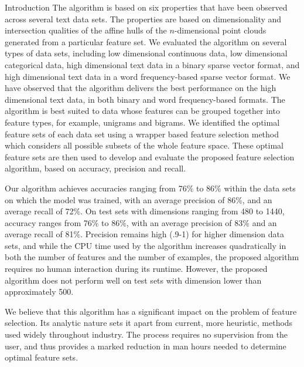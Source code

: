\documentclass{llncs}
\begin{document}
\begin{section}{Introduction}
The algorithm is based on six properties that have been observed across several text data sets. The properties are based on dimensionality and intersection qualities of the affine hulls of the $n$-dimensional point clouds generated from a particular feature set. We evaluated the algorithm on several types of data sets, including low dimensional continuous data, low dimensional categorical data, high dimensional text data in a binary sparse vector format, and high dimensional text data in a word frequency-based sparse vector format. We have observed that the algorithm delivers the  best performance on the high dimensional text data, in both binary and word frequency-based formats. The algorithm is best suited to data whose features can be grouped together into feature types, for example, unigrams and bigrams. We identified the optimal feature sets of each data set using a wrapper based feature selection method which considers all possible subsets of the whole feature space. These optimal feature sets are then used to develop and evaluate the proposed feature selection algorithm, based on accuracy, precision and recall. 

	
Our algorithm achieves accuracies ranging from 76\% to 86\% within the data sets on which the model was trained, with an average precision of 86\%, and an average recall of 72\%. On test sets with dimensions ranging from 480 to 1440, accuracy ranges from 76\% to 86\%, with an average precision of 83\% and an average recall of 81\%. Precision remains high (.9-1) for higher dimension data sets, and while the CPU time used by the algorithm increases quadratically in both the number of features and the number of examples, the proposed algorithm requires no human interaction during its runtime. However, the proposed algorithm does not perform well on test sets with dimension lower than approximately 500.  

We believe that this algorithm has a significant impact on the problem of feature selection. Its analytic nature sets it apart from current, more heuristic, methods used widely throughout industry. The process requires no supervision from the user, and thus provides a marked reduction in man hours needed to determine optimal feature sets.
	 
\end{section}
\end{document}
